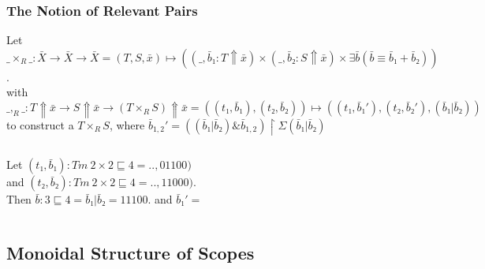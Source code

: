 \documentclass[aspectratio=169]{beamer}
\theoremstyle{remarkstyle}
\begin{document}
\begin{frame}[fragile]
  \frametitle{The Notion of Relevant Pairs}
  \begin{definition}
    Let $\_×_R\_ : \bar{X} → \bar{X} → \bar{X}  = (T, S, \bar{x}) ↦ ((\_, \bar{b}₁ : T ⇑ \bar{x}) × (\_, \bar{b}₂ : S ⇑ \bar{x}) × ∃\bar{b}(\bar{b} ≡ \bar{b}₁ + \bar{b}₂))$. \\ with $\_,_R\_ : T ⇑ \bar{x} → S ⇑ \bar{x} → (T ×_R S) ⇑ \bar{x} = ((t₁, \bar{b}₁), (t₂, \bar{b}₂)) ↦  ((t₁, \bar{b}₁') , (t₂, \bar{b}₂'), (\bar{b}₁|\bar{b}₂))$ to construct a $T×_R S$, where $\bar{b}_{1,2}' = ((\bar{b}₁|\bar{b}₂)\&\bar{b}_{1,2}) ↾ Σ(\bar{b}₁|\bar{b}₂)$\\
  \end{definition}
  \begin{columns}
    \begin{column}{0.53\textwidth}
      \begin{example}
        Let $(t₁, \bar{b}₁) : Tm \ 2 × 2 ⊑ 4 = .. , 01100)$\\
        and $(t₂, \bar{b}₂) : Tm \ 2 × 2 ⊑ 4 = .. , 11000)$.\\
        Then $\bar{b} : 3 ⊑ 4 = \bar{b}₁ | \bar{b}₂ = 11100$.
        and $\bar{b}₁' = $
      \end{example}
    \end{column}
    \begin{column}{0.42\textwidth}
      \begin{example}
      \end{example}
    \end{column}
  \end{columns}

  
\end{frame}

\subsection{Monoidal Structure of Scopes}
\end{document}
